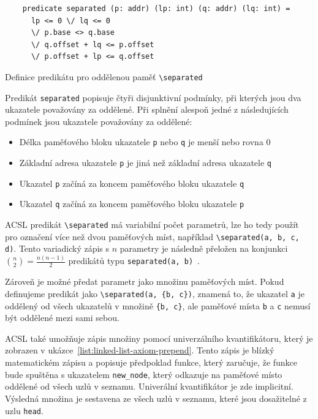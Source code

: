 \begin{listing}[H]
    \begin{verbatim}
    predicate separated (p: addr) (lp: int) (q: addr) (lq: int) =
      lp <= 0 \/ lq <= 0
      \/ p.base <> q.base
      \/ q.offset + lq <= p.offset
      \/ p.offset + lp <= q.offset
    \end{verbatim}
    \caption{Definice predikátu pro oddělenou paměť \texttt{\textbackslash separated}}
    \label{list:why-separated}
\end{listing}

Predikát \texttt{separated} popisuje čtyři disjunktivní podmínky,
při kterých jsou dva ukazatele považovány za oddělené.
Při splnění alespoň jedné z následujících podmínek
jsou ukazatele považovány za oddělené:

\begin{itemize}
    \item Délka paměťového bloku ukazatele \texttt{p} nebo \texttt{q} je menší nebo rovna 0
    \item Základní adresa ukazatele \texttt{p} je jiná než základní adresa ukazatele \texttt{q}
    \item Ukazatel \texttt{p} začíná za koncem paměťového bloku ukazatele \texttt{q}
    \item Ukazatel \texttt{q} začíná za koncem paměťového bloku ukazatele \texttt{p}
\end{itemize}

ACSL predikát \texttt{\textbackslash separated} má variabilní počet parametrů,
lze ho tedy použít pro označení více než dvou paměťových míst, například
\texttt{\textbackslash separated(a, b, c, d)}.
Tento variadický zápis s $n$ parametry
je následně přeložen na konjunkci $\binom{n}{2} = \frac{n(n-1)}{2}$ predikátů typu \texttt{separated(a, b)}~\cite{Correnson2018Separated}.

Zároveň je možné předat parametr jako množinu paměťových míst.
Pokud definujeme predikát jako \texttt{\textbackslash separated(a, \{b, c\})},
znamená to, že ukazatel \texttt{a} je oddělený od všech ukazatelů v množině \texttt{\{b, c\}},
ale paměťové místa \texttt{b} a \texttt{c} nemusí být oddělené mezi sami sebou.

ACSL také umožňuje zápis množiny pomocí univerzálního kvantifikátoru,
který je zobrazen v ukázce~\ref{list:linked-list-axiom-prepend}.
Tento zápis je blízký matematickém zápisu a popisuje předpoklad funkce,
který zaručuje, že funkce bude spuštěna s ukazatelem \texttt{new\_node},
který odkazuje na paměťové místo oddělené od všech uzlů v seznamu.
Univerální kvantifikátor je zde implicitní.
Výsledná množina je sestavena ze všech uzlů v seznamu,
které jsou dosažitelné z uzlu \texttt{head}.

